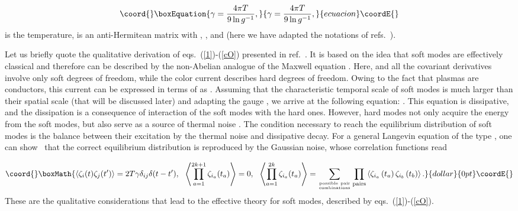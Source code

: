 \documentclass[a4paper,12pt]{article}
\begin{document}
\begin{equation}\coord{}\boxEquation{
\label{gam}
\gamma=\frac{4\pi T}{9\ln g^{-1}},
}{
\gamma=\frac{4\pi T}{9\ln g^{-1}},
}{ecuacion}\coordE{}\end{equation}
\coordHE{} is the temperature,
\coordHE{} is an anti-Hermitean matrix with
\coordHE{}, \coordHE{}, and \coordHE{}
(here we have adapted the notations of refs.~\cite{le, rev}).

Let us briefly quote the qualitative derivation
of eqs.~(\ref{1})-(\ref{cO}) presented in ref.~\cite{asy}. It is based on the idea that soft modes are effectively
classical and therefore can
be described by the non-Abelian analogue of the Maxwell equation
\coordHE{}. Here, \coordHE{} and
all the covariant derivatives involve only soft degrees of freedom, while the color current \coordHE{}
describes hard degrees of freedom. Owing to the fact that plasmas are conductors, this current can be expressed in terms
of \coordHE{} as \coordHE{}. Assuming that the characteristic temporal scale of soft modes is much
larger than their spatial scale (that will be discussed later) and adapting the gauge \coordHE{}, we arrive at the
following equation: \coordHE{}. This equation is dissipative, and the dissipation
is a consequence of interaction of the soft modes with the hard ones. However, hard modes not only acquire the energy from
the soft modes, but also serve as a source of thermal noise \myHighlight{$\vec\zeta$}\coordHE{}. The condition necessary to reach the
equilibrium distribution of soft modes is the balance between their excitation by the thermal noise and dissipative decay.
For a general Langevin equation of the type \coordHE{},
one can show~\cite{zj} that the correct equilibrium distribution \coordHE{} is reproduced by the Gaussian noise,
whose correlation functions read

$$\coord{}\boxMath{\left<\zeta_i(t)\zeta_j(t')\right>=2T\gamma\delta_{ij}\delta(t-t'),~~
\left<\prod\limits_{a=1}^{2k+1}\zeta_{i_a}(t_a)\right>=0,~~
\left<\prod\limits_{a=1}^{2k}\zeta_{i_a}(t_a)\right>=\sum\limits_{{\rm possible~ pair}\atop {\rm combinations}}^{}
\prod\limits_{\rm pairs}^{}\left<\zeta_{i_a}\left(t_a\right)\zeta_{i_b}\left(t_b\right)\right>.}{dollar}{0pt}\coordE{}$$
These are the qualitative considerations that lead to the effective theory for soft modes, described by eqs.~(\ref{1})-(\ref{cO}).
\end{document}
